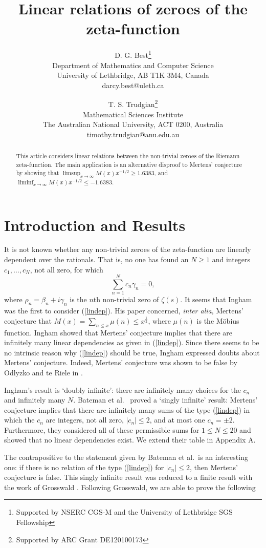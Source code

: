 \documentclass{article}
\title{Linear relations of zeroes of the zeta-function}
\author{D. G. Best\footnote{Supported by NSERC CGS-M and the University of Lethbridge SGS Fellowship}\\Department of Mathematics and Computer Science\\University of Lethbridge, AB T1K 3M4, Canada \\ darcy.best@uleth.ca \and T. S. Trudgian\footnote{Supported by ARC Grant DE120100173}\\Mathematical Sciences Institute\\ The Australian National University, ACT 0200, Australia\\ timothy.trudgian@anu.edu.au}
\numberwithin{equation}{section}
\begin{document}
\maketitle

\begin{abstract}
This article considers linear relations between the non-trivial zeroes of the Riemann zeta-function. The main application is an alternative disproof to Mertens' conjecture by showing that $\limsup_{x\rightarrow\infty} M(x) x^{-1/2} \geq 1.6383$, and  $\liminf_{x\rightarrow\infty} M(x) x^{-1/2} \leq -1.6383.$
\end{abstract}

\section{Introduction and Results}
It is not known whether any non-trivial zeroes of the zeta-function are linearly dependent over the rationals. That is, no one has found an $N\geq 1$ and integers $c_{1}, \ldots, c_{N}$, not all zero, for which
\begin{equation}\label{lindep}
\sum_{n=1}^{N} c_{n} \gamma_{n} = 0,
\end{equation}
where $\rho_{n} = \beta_{n} + i\gamma_{n}$ is the $n$th non-trivial zero of $\zeta(s)$. It seems that Ingham \cite{Ingham1942} was the first to consider (\ref{lindep}). His paper concerned, \textit{inter alia}, Mertens' conjecture that $M(x) = \sum_{n\leq x} \mu(n) \leq x^{\frac{1}{2}}$, where $\mu(n)$ is the M\"{o}bius function. Ingham showed that Mertens' conjecture implies that there are infinitely many linear dependencies as given in (\ref{lindep}). Since there seems to be no intrinsic reason why (\ref{lindep}) should be true, Ingham expressed doubts about Mertens' conjecture. Indeed, Mertens' conjecture was shown to be false by Odlyzko and te Riele in \cite{MertDis}.

Ingham's result is `doubly infinite': there are infinitely many choices for the $c_{n}$ and infinitely many $N$. Bateman et al.\ \cite{Bateman} proved a `singly infinite' result: Mertens' conjecture implies that there are infinitely many sums of the type (\ref{lindep}) in which the $c_{n}$ are integers, not all zero, $|c_{n}|\leq 2$, and at most one $c_{n} = \pm 2.$ Furthermore, they considered all of these permissible sums for $1\leq N \leq 20$ and showed that no linear dependencies exist. We extend their table in Appendix A.

The contrapositive to the statement given by Bateman et al.\ is an interesting one: if there is no relation of the type (\ref{lindep}) for $|c_{n}| \leq 2$, then Mertens' conjecture is false. This singly infinite result was reduced to a finite result with the work of Grosswald \cite{Grosswald}. Following Grosswald, we are able to prove the following
\end{document}
